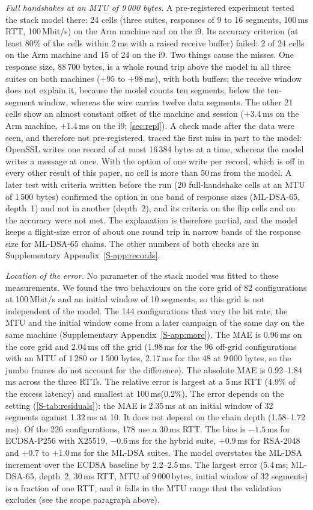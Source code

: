 \documentclass[preprint,12pt]{elsarticle}
\newcommand{\ms}{\,ms\xspace}
\newcommand{\Mbits}{\,Mbit/s\xspace}
\begin{document}
\emph{Full handshakes at an MTU of 9\,000 bytes.} A pre-registered experiment tested the stack model there: 24 cells (three suites, responses of 9 to 16 segments, 100\ms RTT, 100\Mbits) on the Arm machine and on the i9. Its accuracy criterion (at least 80\% of the cells within 2\ms with a raised receive buffer) failed: 2 of 24 cells on the Arm machine and 15 of 24 on the i9. Two things cause the misses. One response size, 88\,700 bytes, is a whole round trip above the model in all three suites on both machines ($+95$ to $+98$\ms), with both buffers; the receive window does not explain it, because the model counts ten segments, below the ten-segment window, whereas the wire carries twelve data segments. The other 21 cells show an almost constant offset of the machine and session ($+3.4$\ms on the Arm machine, $+1.4$\ms on the i9; \cref{sec:repl}). A check made after the data were seen, and therefore not pre-registered, traced the first miss in part to the model: OpenSSL writes one record of at most 16\,384 bytes at a time, whereas the model writes a message at once. With the option of one write per record, which is off in every other result of this paper, no cell is more than 50\ms from the model. A later test with criteria written before the run (20 full-handshake cells at an MTU of 1\,500 bytes) confirmed the option in one band of response sizes (ML-DSA-65, depth~1) and not in another (depth~2), and its criteria on the flip cells and on the accuracy were not met. The explanation is therefore partial, and the model keeps a flight-size error of about one round trip in narrow bands of the response size for ML-DSA-65 chains. The other numbers of both checks are in Supplementary Appendix~\ref{S-app:records}.

\emph{Location of the error.} No parameter of the stack model was fitted to these measurements. We found the two behaviours on the core grid of 82 configurations at 100\Mbits and an initial window of 10 segments, so this grid is not independent of the model. The 144 configurations that vary the bit rate, the MTU and the initial window come from a later campaign of the same day on the same machine (Supplementary Appendix~\ref{S-app:more}). The MAE is 0.96\ms on the core grid and 2.04\ms off the grid (1.98\ms for the 96 off-grid configurations with an MTU of 1\,280 or 1\,500 bytes, 2.17\ms for the 48 at 9\,000 bytes, so the jumbo frames do not account for the difference). The absolute MAE is 0.92--1.84\ms across the three RTTs. The relative error is largest at a 5\ms RTT (4.9\% of the excess latency) and smallest at 100\ms (0.2\%). The error depends on the setting (\cref{S-tab:residuals}): the MAE is 2.35\ms at an initial window of 32 segments against 1.32\ms at 10. It does not depend on the chain depth (1.58--1.72\ms). Of the 226 configurations, 178 use a 30\ms RTT. The bias is $-1.5$\ms for ECDSA-P256 with X25519, $-0.6$\ms for the hybrid suite, $+0.9$\ms for RSA-2048 and $+0.7$ to $+1.0$\ms for the ML-DSA suites. The model overstates the ML-DSA increment over the ECDSA baseline by 2.2--2.5\ms. The largest error (5.4\ms; ML-DSA-65, depth~2, 30\ms RTT, MTU of 9\,000\,bytes, initial window of 32 segments) is a fraction of one RTT, and it falls in the MTU range that the validation excludes (see the scope paragraph above).
\end{document}
